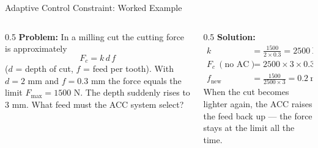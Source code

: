 \documentclass[aspectratio=169]{beamer}
\begin{document}
	\begin{frame}{Adaptive Control Constraint: Worked Example}
		\begin{columns}[T]
			\begin{column}{0.5\textwidth}
				\textbf{Problem:} In a milling cut the cutting force is approximately
				\[
				F_c = k\, d\, f
				\]
				($d$ = depth of cut, $f$ = feed per tooth). With $d = 2$ mm and $f = 0.3$ mm the force equals the limit $F_{\max} = 1500$ N. The depth suddenly rises to $3$ mm. What feed must the ACC system select?
			\end{column}
			\begin{column}{0.5\textwidth}
				\textbf{Solution:}
				\small
				\begin{align*}
					k &= \frac{1500}{2\times0.3} = 2500\ \text{N/mm}^2\\
					F_c\ (\text{no AC}) &= 2500\times3\times0.3 = 2250\ \text{N}\ (\text{overload!})\\
					f_{\text{new}} &= \frac{1500}{2500\times3} = \boxed{0.2\ \text{mm}}
				\end{align*}
				\footnotesize When the cut becomes lighter again, the ACC raises the feed back up --- the force stays at the limit all the time.
			\end{column}
		\end{columns}
	\end{frame}

\end{document}
